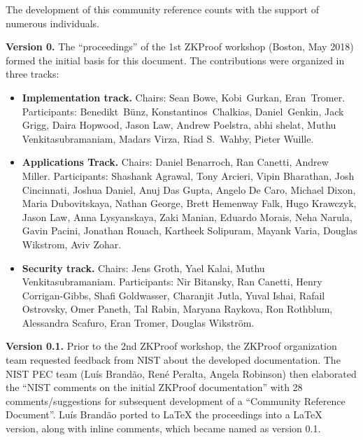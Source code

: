 \label{sec:prelim:acknowledgments}


The development of this community reference counts with the support of numerous individuals.


\textbf{Version 0.}
The ``proceedings'' of the 1st ZKProof workshop (Boston, May 2018) formed the initial basis for this document.
The contributions were organized in three tracks:

\begin{itemize}\setlength{\itemsep}{1ex}
	
\item \textbf{Implementation track.} 
	Chairs: Sean Bowe, Kobi Gurkan, Eran Tromer.
	Participants: Benedikt Bünz, Konstantinos Chalkias, Daniel Genkin, Jack Grigg, Daira Hopwood, Jason Law, Andrew Poelstra, abhi shelat, Muthu Venkita\-subramaniam, Madars Virza, Riad S.\ Wahby, Pieter Wuille.
	
\item \textbf{Applications Track.}
	Chairs: Daniel Benarroch, Ran Canetti, Andrew Miller.
	Participants: Shashank Agrawal, Tony Arcieri, Vipin Bharathan, Josh Cincinnati, Joshua Daniel,  Anuj Das Gupta, Angelo De Caro, Michael Dixon, Maria Dubovitskaya, Nathan George, Brett Hemenway Falk, Hugo Krawczyk, Jason Law, Anna Lysyanskaya, Zaki Manian, Eduardo Morais, Neha Narula, Gavin Pacini, Jonathan Rouach, Kartheek Solipuram, Mayank Varia, Douglas Wikstrom, Aviv Zohar.

\item \textbf{Security track.}
	Chairs: Jens Groth, Yael Kalai, Muthu Venkitasubramaniam.
	Participants: Nir Bitansky, Ran Canetti, Henry Corrigan-Gibbs, Shafi Goldwasser, Charanjit Jutla, Yuval Ishai, Rafail Ostrovsky, Omer Paneth, Tal Rabin, Maryana Raykova, Ron Rothblum, Alessandra Scafuro, Eran Tromer, Douglas Wikström.

\end{itemize}


\textbf{Version 0.1.}
	Prior to the 2nd ZKProof workshop, the ZKProof organization team requested feedback from NIST about the developed documentation.
	The NIST PEC team (Luís Brandão, René Peralta, Angela Robinson) then elaborated the 
``NIST comments on the initial ZKProof documentation'' with 28 comments/suggestions 
for subsequent development of a ``Community Reference Document''.
	Luís Brandão ported to LaTeX the proceedings into a LaTeX version, along with inline comments, which became named as version 0.1.



